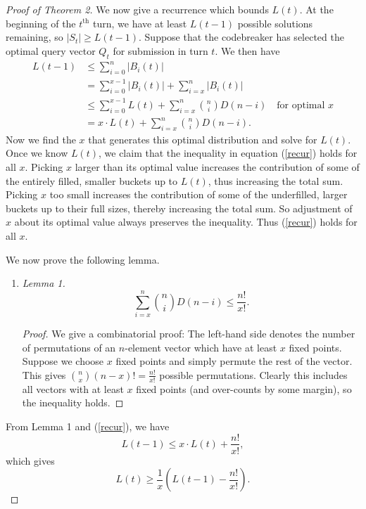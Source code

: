 \documentclass[12pt, a4paper]{article}
\begin{document}
\begin{proof}[Proof of Theorem 2]
		 We now give a recurrence which bounds $L(t)$. At the beginning of the $t^\text{th}$ turn, we have at least $L(t-1)$ possible solutions remaining, so $|S_t|\ge L(t-1)$. Suppose that the codebreaker has selected the optimal query vector $Q_t$ for submission in turn $t$. We then have 
		\begin{align}\label{recur}
			L(t-1)
			& \le \sum_{i = 0}^{n}|B_i(t)|\nonumber\\
			& = \sum_{i=0}^{x-1}|B_i(t)| + \sum_{i=x}^{n}|B_i(t)|\nonumber\\
			& \le \sum_{i = 0}^{x-1}L(t) + \sum_{i=x}^{n}\binom{n}{i}D(n-i)\quad
			\text{for optimal $x$}\nonumber\\
			& = x\cdot L(t) + \sum_{i = x}^{n}\binom{n}{i}D(n-i).
		\end{align}
		Now we find the $x$ that generates this optimal distribution and solve for $L(t)$. Once we know $L(t)$, we claim that the inequality in equation (\ref{recur}) holds for all $x$. Picking $x$ larger than its optimal value increases the contribution of some of the entirely filled, smaller buckets up to $L(t)$, thus increasing the total sum. Picking $x$ too small increases the contribution of some of the underfilled, larger buckets up to their full sizes, thereby increasing the total sum. So adjustment of $x$ about its optimal value always preserves the inequality. Thus (\ref{recur}) holds for all $x$.
		
		
		We now prove the following lemma.
		\begin{enumerate}[label=]
			\item\textit{Lemma 1.}
			\begin{equation*}
				\sum_{i=x}^n\binom{n}{i}D(n-i) \le \frac{n!}{x!}.
			\end{equation*}
			\begin{proof}
				We give a combinatorial proof: The left-hand side denotes the number of permutations of an $n$-element vector which have at least $x$ fixed points. Suppose we choose $x$ fixed points and simply permute the rest of the vector. This gives $\binom{n}{x}(n-x)!=\frac{n!}{x!}$ possible permutations. Clearly this includes all vectors with at least $x$ fixed points (and over-counts by some margin), so the inequality holds.
			\end{proof}
		\end{enumerate}
		
		From Lemma 1 and (\ref{recur}), we have
		\begin{equation*}
			L(t-1) \le x\cdot L(t) + \frac{n!}{x!},
		\end{equation*}
		which gives
		\begin{equation*}
			L(t)\ge \frac{1}{x}\left(L(t-1)-\frac{n!}{x!}\right).
		\end{equation*}
		

\end{proof}
\end{document}
